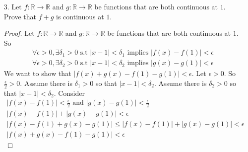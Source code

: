 \documentclass{article}
\theoremstyle{claim}
\theoremstyle{definition}
\begin{document}
\begin{enumerate}
\begin{proof}
        \begin{gather*}
            \text{ There is an injection } i_1: A \rightarrow \mathbb{N}\\
            \text{ There is an injection } i_2: B \rightarrow \mathbb{N}
        \end{gather*}
        Want to show: There is an injection $i_3: A \cup B \rightarrow \mathbb{N}$. We define
        \begin{equation*}
            i_3(x) = \left\{
                \begin{array}{rl}
                    i_1(x) \text{ if } x \in A \text{ and } x \notin B,\\
                    i_2(x) \text{ if } x \in B \text{ and } x \notin A,\\
                    x \text{ if } x \in A \text{ and } x \in B.
                \end{array} \right.
        \end{equation*}
    \end{proof}
\item[3.] Let $f: \mathbb{R} \rightarrow \mathbb{R}$ and $g: \mathbb{R} \rightarrow \mathbb{R}$ be functions that are both continuous at $1$. Prove that $f + g$ is continuous at $1$.
        \begin{proof}
            Let $f: \mathbb{R} \rightarrow \mathbb{R}$ and $g: \mathbb{R} \rightarrow \mathbb{R}$ be functions that are both continuous at $1$. So
            \begin{gather*}
                \forall \epsilon > 0, \exists \delta_1 > 0 \text{ s.t } |x - 1| < \delta_1 \text{ implies } |f(x) - f(1)| < \epsilon\\
                \forall \epsilon > 0, \exists \delta_2 > 0 \text{ s.t } |x - 1| < \delta_2 \text{ implies } |g(x) - g(1)| < \epsilon
            \end{gather*}
            We want to show that $|f(x) + g(x) - f(1) - g(1)| < \epsilon$.
            Let $\epsilon > 0$. So $\frac{\epsilon}{2} > 0$. Assume there is $\delta_1 > 0$ so that $|x - 1| < \delta_2$. Assume there is $\delta_2 > 0$ so that $|x - 1| < \delta_2$. Consider
            \begin{gather*}
                |f(x) - f(1)| < \frac{\epsilon}{2} \text{ and } |g(x) - g(1)| < \frac{\epsilon}{2}\\
                |f(x) - f(1)| + |g(x) - g(1)| < \epsilon\\
                |f(x) - f(1) + g(x) - g(1)| \le |f(x) - f(1)| + |g(x) - g(1)| < \epsilon\\
                |f(x) + g(x) - f(1) - g(1)| < \epsilon
            \end{gather*}
        \end{proof}
\end{enumerate}
\end{document}
